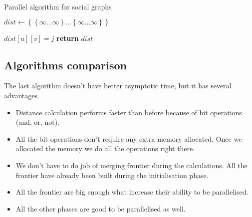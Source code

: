 \FloatBarrier
\begin{algorithm}
\caption{Parallel algorithm for social graphs}\label{all_pairs_social}
\begin{algorithmic}[1]

\State $dist\gets \left\{ {   \left\{ {\infty \ldots \infty}\right\}  \ldots \left\{ {\infty \ldots \infty}\right\} }\right\}$

\State
\algrenewcommand{}
\algrenewcommand{}
		\algrenewcommand{}	
				\State $dist[u][v] = j$		
			\EndIf	
		\EndFor
		\algrenewcommand{}
	\EndFor
\EndFor 
\State \textbf{return} $dist$ 
\EndProcedure

\end{algorithmic}
\end{algorithm}


\FloatBarrier
\subsection{Algorithms comparison}

The last algorithm doesn't have better asymptotic time, but it has several advantages.

\begin{itemize}
  \item Distance calculation performs faster than before because of bit operations (and, or, not).
  \item All the bit operations don't require any extra memory allocated. Once we allocated the memory we do all the operations right there.
  \item We don't have to do job of merging frontier during the calculations. All the frontier have already been built during the initialisation phase. 
  \item All the frontier are big enough what increase their ability to be parallelised.
  \item All the other phases are good to be parallelised as well.
\end{itemize}

